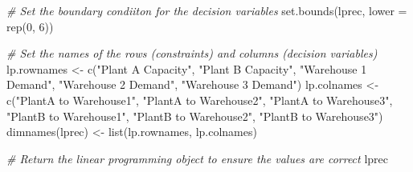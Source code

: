 \documentclass[
]{article}
\newenvironment{Shaded}{\begin{snugshade}}{\end{snugshade}}
\newcommand{\AttributeTok}[1]{\textcolor[rgb]{0.77,0.63,0.00}{#1}}
\newcommand{\CommentTok}[1]{\textcolor[rgb]{0.56,0.35,0.01}{\textit{#1}}}
\newcommand{\DecValTok}[1]{\textcolor[rgb]{0.00,0.00,0.81}{#1}}
\newcommand{\FunctionTok}[1]{\textcolor[rgb]{0.00,0.00,0.00}{#1}}
\newcommand{\NormalTok}[1]{#1}
\newcommand{\OtherTok}[1]{\textcolor[rgb]{0.56,0.35,0.01}{#1}}
\newcommand{\StringTok}[1]{\textcolor[rgb]{0.31,0.60,0.02}{#1}}
\begin{document}
\begin{Shaded}
\begin{Highlighting}[]
\CommentTok{\# Set the boundary condiiton for the decision variables}
\FunctionTok{set.bounds}\NormalTok{(lprec, }\AttributeTok{lower =} \FunctionTok{rep}\NormalTok{(}\DecValTok{0}\NormalTok{, }\DecValTok{6}\NormalTok{))}

\CommentTok{\# Set the names of the rows (constraints) and columns (decision variables)}
\NormalTok{lp.rownames }\OtherTok{\textless{}{-}} \FunctionTok{c}\NormalTok{(}\StringTok{"Plant A Capacity"}\NormalTok{, }\StringTok{"Plant B Capacity"}\NormalTok{, }\StringTok{"Warehouse 1 Demand"}\NormalTok{, }\StringTok{"Warehouse 2 Demand"}\NormalTok{, }\StringTok{"Warehouse 3 Demand"}\NormalTok{)}
\NormalTok{lp.colnames }\OtherTok{\textless{}{-}} \FunctionTok{c}\NormalTok{(}\StringTok{"PlantA to Warehouse1"}\NormalTok{, }\StringTok{"PlantA to Warehouse2"}\NormalTok{, }\StringTok{"PlantA to Warehouse3"}\NormalTok{, }\StringTok{"PlantB to Warehouse1"}\NormalTok{, }\StringTok{"PlantB to Warehouse2"}\NormalTok{, }\StringTok{"PlantB to Warehouse3"}\NormalTok{)}
\FunctionTok{dimnames}\NormalTok{(lprec) }\OtherTok{\textless{}{-}} \FunctionTok{list}\NormalTok{(lp.rownames, lp.colnames)}
\end{Highlighting}
\end{Shaded}

\begin{Shaded}
\begin{Highlighting}[]
\CommentTok{\# Return the linear programming object to ensure the values are correct}
\NormalTok{lprec}
\end{Highlighting}
\end{Shaded}
\end{document}
